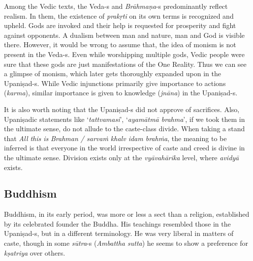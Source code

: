 Among the Vedic texts, the Veda-s and \textit{Brāhmaṇa}-s predominantly reflect realism. In them, the existence of \textit{prakṛti} on its own terms is recognized and upheld. Gods are invoked and their help is requested for prosperity and fight against opponents. A dualism between man and nature, man and God is visible there. However, it would be wrong to assume that, the idea of monism is not present in the Veda-s. Even while worshipping multiple gods, Vedic people were sure that these gods are just manifestations of the One Reality. Thus we can see a glimpse of monism, which later gets thoroughly expanded upon in the Upaniṣad-s. While Vedic injunctions primarily give importance to actions (\textit{karma}), similar importance is given to knowledge (\textit{jnāna}) in the Upaniṣad-s.

It is also worth noting that the Upaniṣad-s did not approve of sacrifices. Also, Upaniṣadic statements like ‘\textit{tattvamasi}’, ‘\textit{ayamātmā brahma}’, if we took them in the ultimate sense, do not allude to the caste-class divide. When taking a stand that \textit{All this is} \textit{Brahman / sarvaṁ khalv  idam brahṁa}, the meaning to be inferred is that everyone in the world irrespective of caste and creed is divine in the ultimate sense. Division exists only at the \textit{vyāvahārika} level, where \textit{avidyā} exists.

\newpage

\subsection*{Buddhism}

Buddhism, in its early period, was more or less a sect than a religion, established by its celebrated founder the Buddha. His teachings resembled those in the Upaniṣad-s, but in a different terminology. He was very liberal in matters of caste, though in some \textit{sūtra}-s (\textit{Ambattha sutta}) he seems to show a preference for \textit{kṣatriya} over others.

